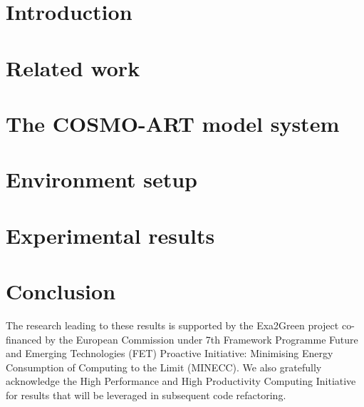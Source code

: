 \documentclass[twocolumn]{svjour3}
\DeclareRobustCommand\IPCClongname{}
\begin{document}
\section{Introduction}
\label{intro}


\section{Related work}
\label{sec:1}


\section{The \textsc{COSMO-ART} model system}
\label{sec:2}


\section{Environment setup}
\label{sec:3}


\section{Experimental results}
\label{sec:4}


\section{Conclusion}
\label{concl}



\begin{acknowledgements}
The research  leading to these  results is supported by  the Exa2Green
project  co-financed by  the European  Commission under  7th Framework
Programme Future and Emerging Technologies (FET) Proactive Initiative:
Minimising Energy  Consumption of Computing to the  Limit (MINECC). We
also gratefully acknowledge the High Performance and High Productivity
Computing Initiative  \citep{HP2C} for results that  will be leveraged
in subsequent code refactoring.
\end{acknowledgements}

\DeclareRobustCommand\IPCClongname{ - Intergovernmental Panel on Climate Change}



\end{document}
